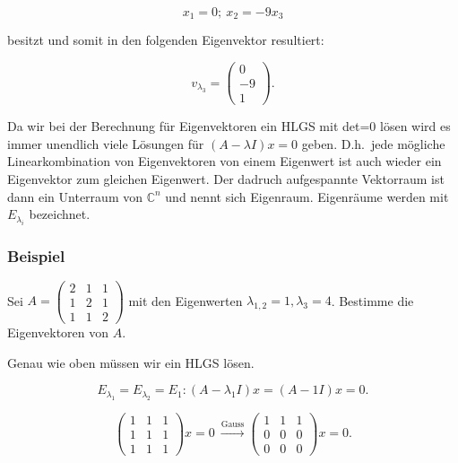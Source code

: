 \begin{equation*}
        x_1 = 0;\ x_2 = -9 x_3 
\end{equation*}

besitzt und somit in den folgenden Eigenvektor resultiert:

\begin{equation*}
        v_{\lambda_3} = \begin{pmatrix} 0 \\ -9 \\ 1 \end{pmatrix}.
\end{equation*}

Da wir bei der Berechnung für Eigenvektoren ein HLGS mit det=0 lösen wird es immer unendlich viele Lösungen für \( (A-\lambda I) x = 0 \) geben. D.h.\ jede mögliche Linearkombination von Eigenvektoren von einem Eigenwert ist auch wieder ein Eigenvektor zum gleichen Eigenwert. Der dadruch aufgespannte Vektorraum ist dann ein Unterraum von \( \mathbb{C}^n \) und nennt sich Eigenraum. Eigenräume werden mit \( E_{\lambda_i} \) bezeichnet.

\subsubsection*{Beispiel}

Sei \( A = \begin{pmatrix} 2 & 1 & 1 \\ 1 & 2 & 1 \\ 1 & 1 & 2 \end{pmatrix} \) mit den Eigenwerten \( \lambda_{1,2} = 1, \lambda_3 = 4 \). Bestimme die Eigenvektoren von \( A \).

\vspace{1\baselineskip}

Genau wie oben müssen wir ein HLGS lösen.

\begin{equation*}
    E_{\lambda_1} = E_{\lambda_2} = E_{1}: (A - \lambda_1 I) x = (A - 1I) x = 0.
\end{equation*}

\begin{equation*}
    \begin{pmatrix} 1 & 1 & 1 \\ 1 & 1 & 1 \\ 1 & 1 & 1 \end{pmatrix} x = 0 \ \xrightarrow[]{\text{Gauss}} \begin{pmatrix} 1 & 1 & 1 \\ 0 & 0 & 0 \\ 0 & 0 & 0 \end{pmatrix} x = 0.
\end{equation*}

